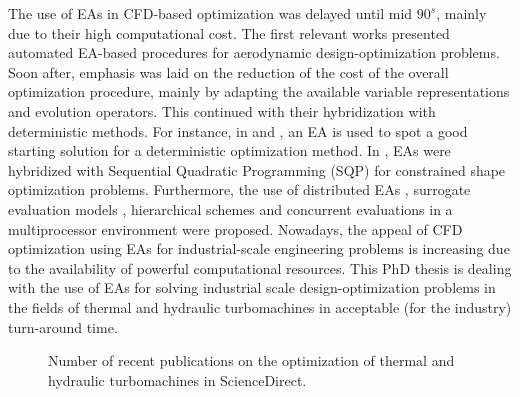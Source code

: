 The use of EAs in CFD-based optimization was delayed until mid $90^s$, mainly due to their high computational cost. The first relevant works \cite{kn:Quag95,per:95,kn:Gala96} presented automated EA-based procedures for aerodynamic design-optimization problems. Soon after, emphasis was laid on the reduction of the cost of the overall optimization procedure, mainly by adapting the available variable representations and evolution operators. This continued with their hybridization with deterministic methods. For instance, in \cite{kn:Mar97} and \cite{kn:Fost97}, an EA is used to spot a good starting solution for a deterministic optimization method. In \cite{dennis:99}, EAs were hybridized with Sequential Quadratic Programming (SQP) for constrained shape optimization problems. Furthermore,  the use of distributed EAs \cite{kn:Door1997,kn:SefrThes}, surrogate evaluation models \cite{kn:Ratl98,kn:Gio99,kn:Gian1999,kn:EBNK,phd_Kampolis}, hierarchical schemes \cite{kn:Eby1998,kn:Sef2000,knowles00mpaes_x41,desideri03,phd_Kampolis} and concurrent evaluations in a multiprocessor environment  \cite{kn:LeeH96,phd_Giotis,phd_Vera} were proposed. Nowadays, the appeal of CFD optimization using EAs for industrial-scale engineering problems is increasing due to the availability of powerful computational resources. This PhD thesis is dealing with the use of EAs for solving industrial scale design-optimization problems in the fields of thermal and hydraulic turbomachines in acceptable (for the industry) turn-around time.   


\begin{figure}[h!]
\begin{minipage}[b]{1\linewidth}
 \centering
\end{minipage}
\caption{Number of recent publications on the optimization of thermal and hydraulic turbomachines in ScienceDirect.} 
\label{pubs.turbo}
\end{figure}
 

